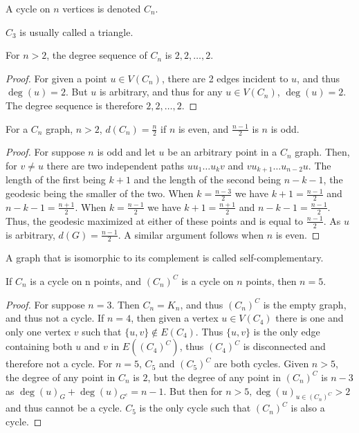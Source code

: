 \documentclass[crop=false,class=book,oneside]{standalone}
\begin{document}
\begin{definition}
A cycle on $n$ vertices is denoted $C_n$.
\end{definition}
\begin{remark}
$C_3$ is usually called a triangle.
\end{remark}
\begin{corollary}
For $n>2$, the degree sequence of $C_n$ is $2,2,\hdots, 2$.
\end{corollary}
\begin{proof}
For given a point $u\in V(C_n)$, there are 2 edges incident to $u$, and thus $\deg(u) = 2$. But $u$ is arbitrary, and thus for any $u\in V(C_n)$, $\deg(u) = 2$. The degree sequence is therefore $2,2,\hdots, 2$.
\end{proof}
\begin{theorem}
For a $C_n$ graph, $n>2$, $d(C_n) = \frac{n}{2}$ if $n$ is even, and $\frac{n-1}{2}$ is $n$ is odd.
\end{theorem}
\begin{proof}
For suppose $n$ is odd and let $u$ be an arbitrary point in a $C_n$ graph. Then, for $v\ne u$ there are two independent paths $uu_1\hdots u_k v$ and $vu_{k+1}\hdots u_{n-2}u$. The length of the first being $k+1$ and the length of the second being $n-k-1$, the geodesic being the smaller of the two. When $k= \frac{n-3}{2}$ we have $k+1 = \frac{n-1}{2}$ and $n-k-1 = \frac{n+1}{2}$. When $k=\frac{n-1}{2}$ we have $k+1 = \frac{n+1}{2}$ and $n-k-1 = \frac{n-1}{2}$. Thus, the geodesic maximized at either of these points and is equal to $\frac{n-1}{2}$. As $u$ is arbitrary, $d(G) = \frac{n-1}{2}$. A similar argument follows when $n$ is even.
\end{proof}
\begin{definition}
A graph that is isomorphic to its complement is called self-complementary.
\end{definition}
\begin{theorem}
If $C_n$ is a cycle on n points, and $(C_n)^C$ is a cycle on $n$ points, then $n = 5$.
\end{theorem}
\begin{proof}
For suppose $n=3$. Then $C_n = K_n$, and thus $(C_n)^C$ is the empty graph, and thus not a cycle. If $n = 4$, then given a vertex $u\in V(C_4)$ there is one and only one vertex $v$ such that $\{u,v\} \notin E(C_4)$. Thus $\{u,v\}$ is the only edge containing both $u$ and $v$ in $E((C_4)^C)$, thus $(C_4)^C$ is disconnected and therefore not a cycle. For $n=5$, $C_5$ and $(C_5)^C$ are both cycles. Given $n>5$, the degree of any point in $C_{n}$ is $2$, but the degree of any point in $(C_n)^C$ is $n-3$ as $\deg(u)_G + \deg(u)_{G^c} = n-1$. But then for $n>5, \deg(u)_{u\in (C_n)^C} > 2$ and thus cannot be a cycle. $C_5$ is the only cycle such that $(C_n)^C$ is also a cycle.
\end{proof}
\end{document}
